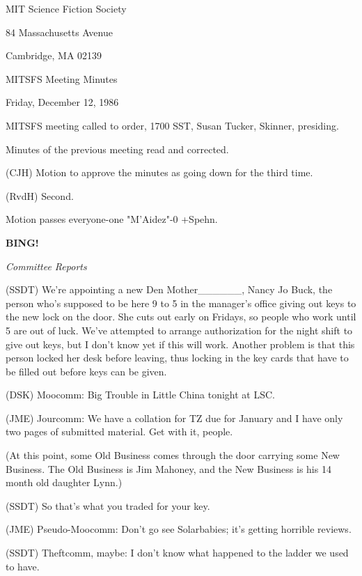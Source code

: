\documentclass[12pt]{article}
\newcommand{\bing}{{\bf BING!} }
\newcommand{\goto}[1]{\bing \vskip 12pt \centerline{{\em{#1}}}}
\begin{document}
\begin{center}

MIT Science Fiction Society 

84 Massachusetts Avenue

Cambridge, MA 02139

\vspace{12pt}

MITSFS Meeting Minutes 

Friday, December 12, 1986

\end{center}
 
\vspace{18pt}

\setlength{\parskip}{6pt}

\noindent
MITSFS meeting called to order, 1700 SST,
Susan Tucker, Skinner, presiding.

Minutes of the previous meeting read and corrected.

(CJH) Motion to approve the minutes as going down for the third time.

(RvdH) Second.

Motion passes everyone-one "M'Aidez"-0 +Spehn.

\goto{Committee Reports}

(SSDT) We're appointing a new Den Mother______, Nancy Jo Buck, the person who's supposed to be here 9 to 5 in the manager's office giving out keys to the new lock on the door. She cuts out early on Fridays, so people who work until 5 are out of luck. We've attempted to arrange authorization for the night shift to give out keys, but I don't know yet if this will work. Another problem is that this person locked her desk before leaving, thus locking in the key cards that have to be filled out before keys can be given.

(DSK) Moocomm: Big Trouble in Little China tonight at LSC.

(JME) Jourcomm: We have a collation for TZ due for January and I have only two pages of submitted material. Get with it, people.

(At this point, some Old Business comes through the door carrying some New Business. The Old Business is Jim Mahoney, and the New Business is his 14 month old daughter Lynn.)

(SSDT) So that's what you traded for your key.

(JME) Pseudo-Moocomm: Don't go see Solarbabies; it's getting horrible reviews.

(SSDT) Theftcomm, maybe: I don't know what happened to the ladder we used to have.
\end{document}
